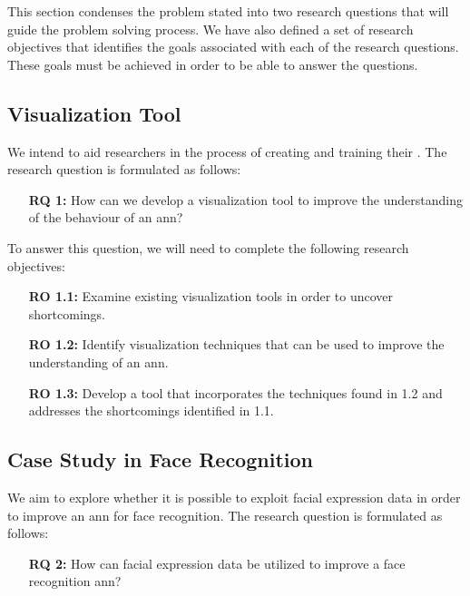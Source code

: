 This section condenses the problem stated into two research questions that will guide the problem solving process. We have also defined a set of research objectives that identifies the goals associated with each of the research questions. These goals must be achieved in order to be able to answer the questions.

\subsection{Visualization Tool}

We intend to aid researchers in the process of creating and training their . The research question is formulated as follows:

\begin{enumerate}[align=left, labelwidth=3.5em, leftmargin=!, itemindent=0em]
    \item[\textbf{RQ 1:}]How can we develop a visualization tool to improve the understanding of the behaviour of an \acrshort{ann}?
\end{enumerate}

\noindent To answer this question, we will need to complete the following research objectives:

\begin{enumerate}[align=left, labelwidth=3.5em, leftmargin=!, itemindent=0em]
    \item[\textbf{RO 1.1:}] Examine existing visualization tools in order to uncover shortcomings.
    \item[\textbf{RO 1.2:}] Identify visualization techniques that can be used to improve the understanding of an \acrshort{ann}.
    \item[\textbf{RO 1.3:}] Develop a tool that incorporates the techniques found in 1.2 and addresses the shortcomings identified in 1.1.
\end{enumerate}

\subsection{Case Study in Face Recognition}

We aim to explore whether it is possible to exploit facial expression data in order to improve an \acrshort{ann} for face recognition. The research question is formulated as follows:

\begin{enumerate}[align=left, labelwidth=3.5em, leftmargin=!, itemindent=0em]
    \item[\textbf{RQ 2:}] How can facial expression data be utilized to improve a face recognition \acrshort{ann}?
\end{enumerate}

